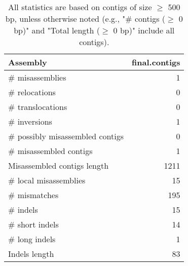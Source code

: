 \documentclass[12pt,a4paper]{article}
\begin{document}
\begin{table}[ht]
\begin{center}
\caption{All statistics are based on contigs of size $\geq$ 500 bp, unless otherwise noted (e.g., "\# contigs ($\geq$ 0 bp)" and "Total length ($\geq$ 0 bp)" include all contigs).}
\begin{tabular}{|l*{1}{|r}|}
\hline
Assembly & final.contigs \\ \hline
\# misassemblies & 1 \\ \hline
\hspace{5mm}\# relocations & 0 \\ \hline
\hspace{5mm}\# translocations & 0 \\ \hline
\hspace{5mm}\# inversions & 1 \\ \hline
\# possibly misassembled contigs & 0 \\ \hline
\# misassembled contigs & 1 \\ \hline
Misassembled contigs length & 1211 \\ \hline
\# local misassemblies & 15 \\ \hline
\# mismatches & 195 \\ \hline
\# indels & 15 \\ \hline
\hspace{5mm}\# short indels & 14 \\ \hline
\hspace{5mm}\# long indels & 1 \\ \hline
Indels length & 83 \\ \hline
\end{tabular}
\end{center}
\end{table}
\end{document}
